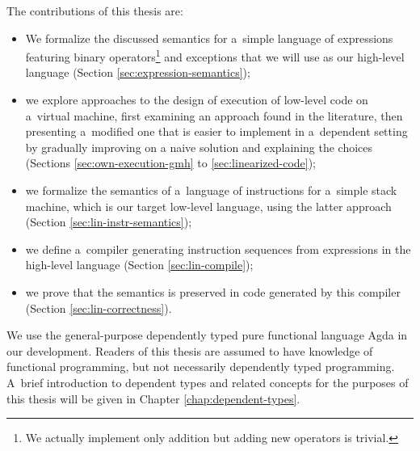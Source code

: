 \noindent The contributions of this thesis are:
\begin{itemize}
	\item We formalize the discussed semantics for a~simple language of expressions
		featuring binary operators\footnote{We actually implement only addition but adding new
		operators is trivial.} and exceptions that we will use as our high-level language
		(Section \ref{sec:expression-semantics});
	\item we explore approaches to the design of execution of low-level code on a~virtual
		machine, first examining an approach found in the
		literature, then presenting a~modified one that is easier to implement in a~dependent
		setting by gradually improving on a naive solution and explaining the choices
		(Sections \ref{sec:own-execution-gmh} to \ref{sec:linearized-code});
	\item we formalize the semantics of a~language of instructions for a~simple stack machine,
		which is our target low-level language, using the latter approach
		(Section \ref{sec:lin-instr-semantics});
	\item we define a~compiler generating instruction sequences from expressions in the high-level
		language (Section \ref{sec:lin-compile});
	\item we prove that the semantics is preserved in code generated by this compiler
		(Section \ref{sec:lin-correctness}).
\end{itemize}

\noindent We use the general-purpose dependently typed pure functional language Agda in
our development.
Readers of this thesis are assumed to have knowledge of functional programming, but
not necessarily dependently typed programming. A~brief introduction to dependent types and
related concepts for the purposes of this thesis will be given in Chapter \ref{chap:dependent-types}.
